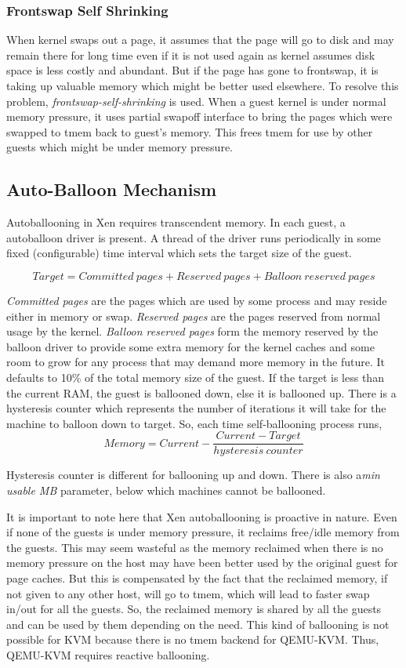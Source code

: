 \subsubsection{Frontswap Self Shrinking}

When kernel swaps out a page, it assumes that the page will go to disk and may remain there for long time even if it is not used again as kernel assumes disk space is less costly and abundant. But if the page has gone to frontswap, it is taking up valuable memory which might be better used elsewhere. To resolve this problem, \textit{frontswap-self-shrinking} is used. When a guest kernel is under normal memory pressure, it uses partial swapoff interface to bring the pages which were swapped to tmem back to guest's memory. This frees tmem for use by other guests which might be under memory pressure.

\subsection{Auto-Balloon Mechanism}
Autoballooning in Xen requires transcendent memory. In each guest, a autoballoon driver is present. A thread of the driver runs periodically in some fixed (configurable) time interval which sets the target size of the guest.


$$Target = Committed\ pages + Reserved\ pages + Balloon\ reserved\ pages$$


\textit{Committed pages} are the pages which are used by some process and may reside either in memory or swap. \textit{Reserved pages} are the pages reserved from normal usage by the kernel. \textit{Balloon reserved pages} form the memory reserved by the balloon driver to provide some extra memory for the kernel caches and some room to grow for any process that may demand more memory in the future. It defaults to 10\% of the total memory size of the guest. If the target is less than the current RAM, the guest is ballooned down, else it is ballooned up. There is a hysteresis counter which represents the number of iterations it will take for the machine to balloon down to target. So, each time self-ballooning process runs, 
$$Memory = Current - \frac{Current-Target}{hysteresis\ counter}$$

Hysteresis counter is different for ballooning up and down. There is also a\textit{min usable MB} parameter, below which machines cannot be ballooned.

It is important to note here that Xen autoballooning is proactive in nature. Even if none of the guests is under memory pressure, it reclaims free/idle memory from the guests. This may seem wasteful as the memory reclaimed when there is no memory pressure on the host may have been better used by the original guest for page caches. But this is compensated by the fact that the reclaimed memory, if not given to any other host, will go to tmem, which will lead to faster swap in/out for all the guests. So, the reclaimed memory is shared by all the guests and can be used by them depending on the need. This kind of ballooning is not possible for KVM because there is no tmem backend for QEMU-KVM. Thus, QEMU-KVM requires reactive ballooning.

